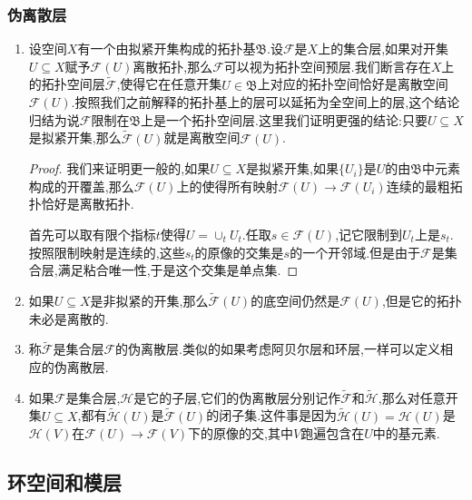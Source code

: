 \subsubsection{伪离散层}

\begin{enumerate}
	\item 设空间$X$有一个由拟紧开集构成的拓扑基$\mathfrak{B}$.设$\mathscr{F}$是$X$上的集合层,如果对开集$U\subseteq X$赋予$\mathscr{F}(U)$离散拓扑,那么$\mathscr{F}$可以视为拓扑空间预层.我们断言存在$X$上的拓扑空间层$\widetilde{\mathscr{F}}$,使得它在任意开集$U\in\mathfrak{B}$上对应的拓扑空间恰好是离散空间$\mathscr{F}(U)$.按照我们之前解释的拓扑基上的层可以延拓为全空间上的层,这个结论归结为说$\mathscr{F}$限制在$\mathfrak{B}$上是一个拓扑空间层.这里我们证明更强的结论:只要$U\subseteq X$是拟紧开集,那么$\widetilde{\mathscr{F}}(U)$就是离散空间$\mathscr{F}(U)$.
	\begin{proof}
		
		我们来证明更一般的,如果$U\subseteq X$是拟紧开集,如果$\{U_i\}$是$U$的由$\mathfrak{B}$中元素构成的开覆盖,那么$\mathscr{F}(U)$上的使得所有映射$\mathscr{F}(U)\to\mathscr{F}(U_i)$连续的最粗拓扑恰好是离散拓扑.
		
		\qquad
		
		首先可以取有限个指标$t$使得$U=\cup_tU_t$.任取$s\in\mathscr{F}(U)$,记它限制到$U_t$上是$s_t$.按照限制映射是连续的,这些$s_t$的原像的交集是$s$的一个开邻域.但是由于$\mathscr{F}$是集合层,满足粘合唯一性,于是这个交集是单点集.
	\end{proof}
	\item 如果$U\subseteq X$是非拟紧的开集,那么$\widetilde{\mathscr{F}}(U)$的底空间仍然是$\mathscr{F}(U)$,但是它的拓扑未必是离散的.
	\item 称$\widetilde{\mathscr{F}}$是集合层$\mathscr{F}$的伪离散层.类似的如果考虑阿贝尔层和环层,一样可以定义相应的伪离散层.
	\item 如果$\mathscr{F}$是集合层,$\mathscr{H}$是它的子层,它们的伪离散层分别记作$\widetilde{\mathscr{F}}$和$\widetilde{\mathscr{H}}$,那么对任意开集$U\subseteq X$,都有$\widetilde{\mathscr{H}}(U)$是$\widetilde{\mathscr{F}}(U)$的闭子集.这件事是因为$\widetilde{\mathscr{H}}(U)=\mathscr{H}(U)$是$\mathscr{H}(V)$在$\mathscr{F}(U)\to\mathscr{F}(V)$下的原像的交,其中$V$跑遍包含在$U$中的基元素.
\end{enumerate}
\newpage
\subsection{环空间和模层}
